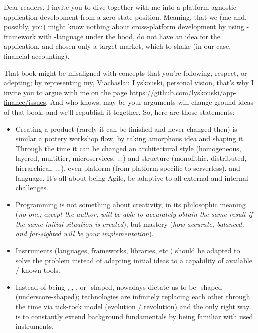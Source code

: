 

Dear readers, I invite you to dive together with me into a platform-agnostic application development from a zero-state 
position. Meaning, that we (me and, possibly, you) might know nothing about cross-platform development by using
-framework with -language under the hood, do not have an idea for the application, and chosen only a
target market, which to shake (in our case, -- financial accounting).

That book might be misaligned with concepts that you're following, respect, or adepting; by representing my, 
Viachaslau Lyskouski, personal vision, that's why I invite you to argue with me on the page
\href{https://github.com/lyskouski/app-finance/issues}{https://github.com/lyskouski/app-finance/issues}. And who knows,
may be your arguments will change ground ideas of that book, and we'll republish it together. So, here are those 
statements:

\begin{itemize}
    \item Creating a product (rarely it can be finished and never changed then) is similar a pottery workshop flow, 
    by taking amorphous idea and shaping it. Through the time it can be changed an architectural style (homogeneous, 
    layered, multitier, microservices, ...) and structure (monolithic, distributed, hierarchical, ...), even platform 
    (from platform specific to serverless), and language. It's all about being Agile, be adaptive to all external and 
    internal challenges.

    \item Programming is not something about creativity, in its philosophic meaning (\emph{no one, except the author, 
    will be able to accurately obtain the same result if the same initial situation is created}), but mastery 
    (\emph{how accurate, balanced, and far-sighted will be your implementation}).

    \item Instruments (languages, frameworks, libraries, etc.) should be adapted to solve the problem instead of 
    adapting initial ideas to a capability of available / known tools.

    \item Instead of being , , , or -shaped, nowadays dictate us to be \q{\_}-shaped 
    (underscore-shaped); technologies are infinitely replacing each other through the time via tick-tock model 
    (evolution / revolution) and the only right way is to constantly extend background fundamentals by being familiar 
    with used instruments.
\end{itemize}

